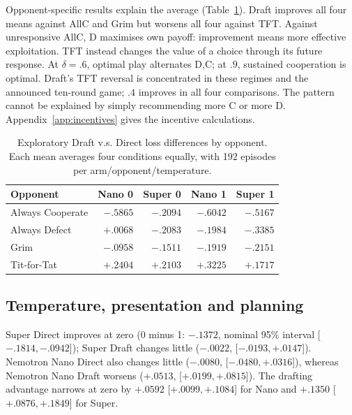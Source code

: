 \documentclass[11pt,a4paper]{article}
\begin{document}
Opponent-specific results explain the average (Table~\ref{tab:policy}).
Draft improves all four means against AllC and Grim but worsens all four
against TFT. Against unresponsive AllC, D maximises own payoff: improvement
means more effective exploitation. TFT instead changes the value of a choice
through its future response. At $\delta=.6$, optimal play alternates D,C;
at $.9$, sustained cooperation is optimal. Draft's TFT reversal is concentrated
in these regimes and the announced ten-round game; $.4$ improves in all four
comparisons. The pattern cannot be explained by simply recommending more C or
more D. Appendix~\ref{app:incentives} gives the incentive calculations.
\begin{table}[htbp]\centering\small
\begin{tabular}{lrrrr}
\toprule
Opponent & Nano 0 & Super 0 & Nano 1 & Super 1\\
\midrule
Always Cooperate & $-.5865$ & $-.2094$ & $-.6042$ & $-.5167$\\
Always Defect & $+.0068$ & $-.2083$ & $-.1984$ & $-.3385$\\
Grim & $-.0958$ & $-.1511$ & $-.1919$ & $-.2151$\\
Tit-for-Tat & $+.2404$ & $+.2103$ & $+.3225$ & $+.1717$\\
\bottomrule
\end{tabular}
\caption{Exploratory Draft v.s. Direct loss differences by opponent. Each mean
averages four conditions equally, with 192 episodes per arm/opponent/temperature.}
\label{tab:policy}
\end{table}

\subsection{Temperature, presentation and planning}
Super Direct improves at zero
(0 minus 1: $-.1372$, nominal 95\% interval [$-.1814,-.0942$]); Super Draft
changes little ($-.0022$, [$-.0193,+.0147$]). Nemotron Nano Direct also changes little
($-.0080$, [$-.0480,+.0316$]), whereas Nemotron Nano Draft worsens ($+.0513$,
[$+.0199,+.0815$]). The drafting advantage narrows at zero by $+.0592$
[$+.0099,+.1084$] for Nano and $+.1350$ [$+.0876,+.1849$] for Super.

\end{document}
